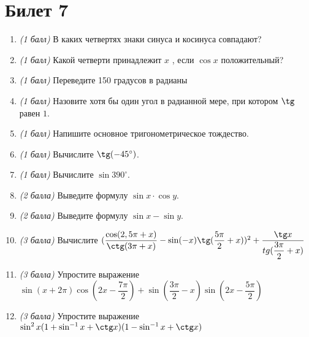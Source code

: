 \documentclass[12pt, a4paper]{article}
\begin{document}
	\section*{Билет 7}
	\begin{enumerate}
		\item \textit{(1 балл)}	В каких четвертях знаки синуса и косинуса совпадают? 
		\item \textit{(1 балл)}	Какой четверти принадлежит $x$ , если $\cos x$ положительный?
		\item \textit{(1 балл)}	Переведите 150 градусов в радианы
		\item \textit{(1 балл)}	Назовите хотя бы один угол в радианной мере, при котором $\tg$  равен $1$.
		\item \textit{(1 балл)}	Напишите основное тригонометрическое тождество.
		\item \textit{(1 балл)} Вычислите $\tg (-45^{\circ})$.
		\item \textit{(1 балл)}	Вычислите $\sin 390^{\circ}$.
		\item \textit{(2 балла)} Выведите формулу $\sin x \cdot \cos y$.
		\item \textit{(2 балла)} Выведите формулу $\sin x - \sin y$.
		\item \textit{(3 балла)} Вычислите $(\dfrac{\cos (2,5\pi + x)}{\ctg (3\pi + x)} - \sin (-x) \tg (\dfrac{5\pi}{2}+x))^2 + \dfrac{\tg x}{tg (\dfrac{3\pi}{2}+x)}$
		\item \textit{(3 балла)} Упростите выражение $\sin (x+2\pi) \cos (2x-\dfrac{7\pi}{2})+ \sin (\dfrac{3\pi}{2}-x) \sin (2x - \dfrac{5\pi}{2})$
		\item \textit{(3 балла)} Упростите выражение $\sin^2 x(1+\sin^{-1}x + \ctg x)(1 - \sin^{-1}x + \ctg x)$
	\end{enumerate}
\end{document}
